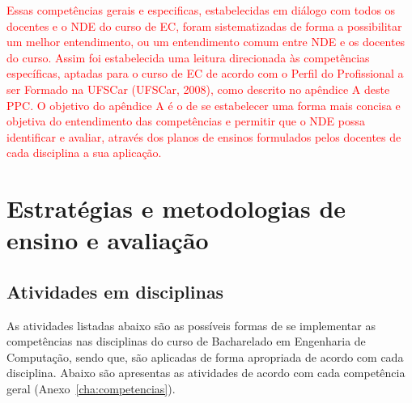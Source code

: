 \textcolor{red}{Essas competências gerais e especificas, estabelecidas em diálogo com todos os docentes e o NDE do curso de EC, foram sistematizadas de forma a possibilitar um melhor entendimento, ou um entendimento comum entre NDE e os docentes do curso. Assim foi estabelecida uma leitura direcionada às competências específicas, aptadas para o curso de EC de acordo com o Perfil do Profissional a ser Formado na UFSCar (UFSCar, 2008), como descrito no apêndice A deste PPC. O objetivo do apêndice A é o de se estabelecer uma forma mais concisa e objetiva do entendimento das competências e permitir que o NDE possa identificar e avaliar, através dos planos de ensinos formulados pelos docentes de cada disciplina a sua aplicação.}



\section{Estratégias e metodologias de ensino e avaliação}\label{sec:estrategias-e-metodologias-de-ensino-e-avaliacao}

\subsection{Atividades em disciplinas}\label{sec:atividades-em-disciplinas}


As atividades listadas abaixo são as possíveis formas de se implementar as competências nas disciplinas do curso de Bacharelado em Engenharia de Computação, sendo que, são aplicadas de forma apropriada de acordo com cada disciplina. Abaixo são apresentas as atividades de acordo com cada competência geral (Anexo~\ref{cha:competencias}).
                         



